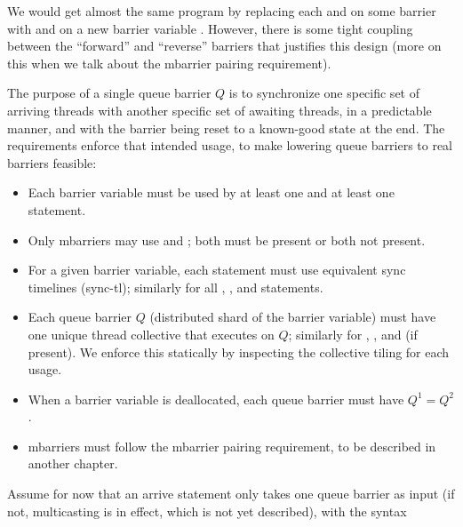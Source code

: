 \filbreak
We would get almost the same program by replacing each  and  on some barrier  with  and  on a new barrier variable .
However, there is some tight coupling between the ``forward'' and ``reverse'' barriers that justifies this design (more on this when we talk about the mbarrier pairing requirement).

\filbreak
{}

The purpose of a single queue barrier $Q$ is to synchronize one specific set of arriving threads with another specific set of awaiting threads, in a predictable manner, and with the barrier being reset to a known-good state at the end.
The requirements enforce that intended usage, to make lowering queue barriers to real barriers feasible:

\filbreak
\begin{itemize}
  \item Each barrier variable must be used by at least one  and at least one  statement.
  \filbreak
  \item Only mbarriers may use  and ; both must be present or both not present.
  \filbreak
  \item For a given barrier variable, each  statement must use equivalent sync timelines (sync-tl); similarly for all , , and  statements.
  \filbreak
  \item Each queue barrier $Q$ (distributed shard of the barrier variable) must have one unique thread collective that executes  on $Q$; similarly for , , and  (if present). We enforce this statically by inspecting the collective tiling for each usage.
  \filbreak
  \item When a barrier variable is deallocated, each queue barrier must have $Q^1 = Q^2$.
  \filbreak
  \item mbarriers must follow the mbarrier pairing requirement, to be described in another chapter.
\end{itemize}

\filbreak
{}

Assume for now that an arrive statement only takes one queue barrier as input (if not, multicasting is in effect, which is not yet described), with the syntax\\

